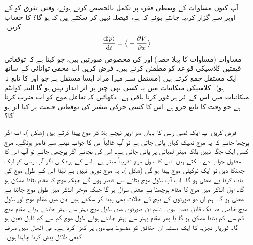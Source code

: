آپ کیوں مساوات  کے وسطی فقرہ پر تکمل بالحصص کرتے ہوئے، وقتی تفرق کو  کے اوپر سے گزار کر،یہ جانتے ہوئے کہ  ہے، فیصلہ نہیں کر سکتے ہیں کہ  ہو گا؟
 کا حساب کریں۔
\begin{align}\label{مساوات_تفاعل_موج_مخفی_توانائی_سے_معیار_حرکت}
\frac{\dif\langle p \rangle}{\dif t}=\big\langle-\frac{\partial V}{\partial x} \big\rangle
\end{align}
مساوات  (مساوات  کا پہلا حصہ) اور   کی مخصوص صورتیں ہیں، جو کہتا ہے کہ توقعاتی قیمتیں کلاسیکی قواعد کو مطمئن کرتے ہیں۔
فرض کریں آپ مخفی توانائی کے ساتھ ایک مستقل جمع کرتے ہیں (مستقل سے میرا مراد ایسا مستقل ہے  جو  اور  کا تابع نہ ہو)۔ کلاسیکی میکانیات میں یہ کسی بھی چیز پر اثر انداز نہیں ہو گا البتہ کوانٹم میکانیات میں اس کے اثر پر غور کرنا باقی ہے۔ دکھائیں کہ تفاعل موج کو اب  ضرب کرتا ہے جو وقت کا تابع جزو ہے۔اس کا کسی حرکی متغیر کی توقعاتی قیمت پر کیا اثر ہو گا؟ 

فرض کریں آپ ایک لمبی رسی کا  بایاں  سر اوپر نیچے  ہلا کر موج پیدا کرتے ہیں (شکل )۔ اب اگر پوچھا جائے کہ یہ موج ٹھیک  کہاں پائی جاتی ہے تو آپ غالباً اس کا جواب دینے سے قاصر ہونگے۔ موج کسی ایک جگہ نہیں بلکہ    میٹر لمبائی پر پائی جاتی ہے۔ اس کی بجائے اگر   پوچھی جائے  تو آپ اس کا معقول جواب دے سکتے ہیں:  اس کا طول موج تقریباً      میٹر ہے۔ اس کے برعکس اگر آپ رسی کو ایک جھٹکا دیں تو  ایک نوکیلی موج پیدا ہو گی
 (شکل )۔ یہ موج دوری نہیں ہے لہٰذا اس کے طول موج کی بات کرنا بے معنی ہو گا۔ اب آپ طول موج بتانے سے قاصر ہوں گے جبکہ  موج کا مقام بتانا ممکن ہو گا۔ اول الذکر  میں موج کا مقام پوچھنا بے معنی سوال ہو گا جبکہ موخر الذکر میں طول موج جاننا بے معنی  ہو گا۔ ہم ان دو صورتوں کے بیچ کے حالات بھی پیدا کر سکتے ہیں  جن میں  مقام موج   اور  طول موج خاصی حد تک قابل تعین ہوں۔ تاہم ان صورتوں میں طول موج بہتر سے بہتر جانتے ہوئے مقام موج کم سے کم بتانا ممکن ہو گا یا پھر مقام بہتر سے بہتر جانتے ہوئے طول موج کم سے کم قابل تعین   ہو گا۔ فوریئر تجزیہ کا ایک مسئلہ ان حقائق کو مضبوط بنیادوں پر کھڑا کرتا ہے۔ فی الحال میں صرف کیفی دلائل پیش کرنا چاہتا ہوں۔

